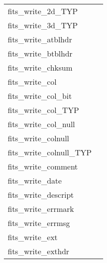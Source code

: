 \documentclass[11pt]{book}
\begin{document}
\begin{tabular}{lr}
fits\_write\_2d\_TYP   & \pageref{ffp2dx} \\
fits\_write\_3d\_TYP   & \pageref{ffp3dx} \\
fits\_write\_atblhdr      & \pageref{ffphtb} \\
fits\_write\_btblhdr      & \pageref{ffphbn} \\
fits\_write\_chksum   & \pageref{ffpcks} \\
fits\_write\_col         & \pageref{ffpcl} \\
fits\_write\_col\_bit     & \pageref{ffpclx} \\
fits\_write\_col\_TYP     & \pageref{ffpcls} \\
fits\_write\_col\_null      & \pageref{ffpclu} \\
fits\_write\_colnull      & \pageref{ffpcn} \\
fits\_write\_colnull\_TYP & \pageref{ffpcnx} \\
fits\_write\_comment      & \pageref{ffpcom} \\
fits\_write\_date         & \pageref{ffpdat} \\
fits\_write\_descript  & \pageref{ffpdes} \\
fits\_write\_errmark   & \pageref{ffpmrk} \\
fits\_write\_errmsg   & \pageref{ffpmsg} \\
fits\_write\_ext        & \pageref{ffgextn} \\
fits\_write\_exthdr        & \pageref{ffphps} \\
\end{tabular}
\newpage
\end{document}
